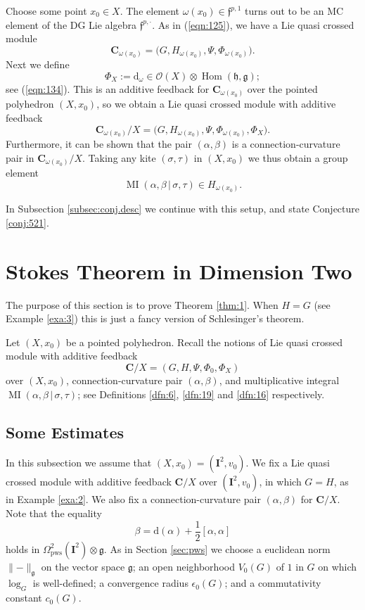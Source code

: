 \documentclass[10pt, a4paper]{amsart}
\theoremstyle{definition}
\numberwithin{equation}{section}
\newcommand{\opn}{\operatorname}
\newcommand{\bdot}{\bsym{\cdot}}
\newcommand{\mfrak}[1]{\mathfrak{#1}}
\newcommand{\mcal}[1]{\mathcal{#1}}
\newcommand{\mbf}[1]{\mathbf{#1}}
\newcommand{\mrm}[1]{\mathrm{#1}}
\newcommand{\smfrac}[2]{{\textstyle \frac{#1}{#2}}}
\newcommand{\bsym}[1]{\boldsymbol{#1}}
\newcommand{\norm}[1]{\lVert #1 \rVert}
\renewcommand{\vert}{\, | \,}
\newcommand{\g}{\mfrak{g}}
\newcommand{\h}{\mfrak{h}}
\newcommand{\f}{\mfrak{f}}
\renewcommand{\d}{\mrm{d}}
\newcommand{\lb}{\linebreak}
\begin{document}
Choose some point $x_0 \in X$. The element 
$\omega(x_0) \in \f^{p, 1}$ turns out to be an MC element of the DG
Lie algebra $\f^{p, \bdot}$.
As in (\ref{eqn:125}), we have a Lie quasi crossed module 
\[  \mbf{C}_{\omega(x_0)}  =  
\bigl( G, H_{\omega(x_0)}, \Psi, \Phi_{\omega(x_0)} \bigr)  . \]
Next we define
\[ \Phi_{X} := \d_{\omega} \in 
\mcal{O}(X) \otimes \opn{Hom}(\h, \g) ; \]
see (\ref{eqn:134}). This is an additive feedback for $\mbf{C}_{\omega(x_0)}$
over the pointed polyhedron $(X, x_0)$, so we obtain a 
Lie quasi crossed module with additive feedback
\begin{equation} \label{eqn:522}
 \mbf{C}_{\omega(x_0)} / X  =  
\bigl( G, H_{\omega(x_0)}, \Psi, \Phi_{\omega(x_0)}, \Phi_{X} \bigr)  .
\end{equation}
Furthermore, it can be shown that the pair $(\alpha, \beta)$ is a
connection-curvature pair in 
$\mbf{C}_{\omega(x_0)} / X$. 
Taking any kite $(\sigma, \tau)$ in $(X, x_0)$ we thus obtain a group element 
\[ \opn{MI}(\alpha, \beta \vert \sigma, \tau) \in 
H_{\omega(x_0)} . \]

In Subsection \ref{subsec:conj.desc} we continue with this setup, and state
Conjecture \ref{conj:521}.





\cleardoublepage
\section{Stokes Theorem in Dimension Two}
\label{sec:stokes2}

The purpose of this section is to prove Theorem \ref{thm:1}.
When $H = G$ (see Example \ref{exa:3}) this is just a fancy
version of Schlesinger's theorem. 

Let  $(X, x_0)$ be a pointed polyhedron.
Recall the notions of Lie quasi crossed module with additive feedback
\begin{equation}
\mbf{C} / X = (G, H, \Psi, \Phi_0, \Phi_X)
\end{equation}
over $(X, x_0)$, connection-curvature pair $(\alpha, \beta)$, and 
multiplicative integral \lb
$\opn{MI}(\alpha, \beta \vert \sigma, \tau)$;
see Definitions \ref{dfn:6}, \ref{dfn:19} and \ref{dfn:16}
respectively.

\subsection{Some Estimates}
In this subsection we assume that $(X, x_0) = (\mbf{I}^2, v_0)$.
We fix a Lie quasi crossed module with additive feedback
$\mbf{C} / {X}$ over $(\mbf{I}^2, v_0)$, in which $G = H$, as in Example
\ref{exa:2}. We also fix a connection-curvature pair $(\alpha, \beta)$ for
$\mbf{C} / {X}$. Note that the equality
\begin{equation} \label{eqn:75}
\beta = \d (\alpha) + \smfrac{1}{2} [\alpha, \alpha] 
\end{equation}
holds in $\Omega^2_{\mrm{pws}}(\mbf{I}^2)  \otimes \mfrak{g}$.
As in Section \ref{sec:pws} we choose a euclidean norm $\norm{-}_{\g}$
on the vector space $\g$; an open neighborhood $V_0(G)$ of $1$
in $G$ on which $\log_G$ is well-defined; a convergence radius
$\epsilon_0(G)$; and a commutativity constant $c_0(G)$.
\end{document}
